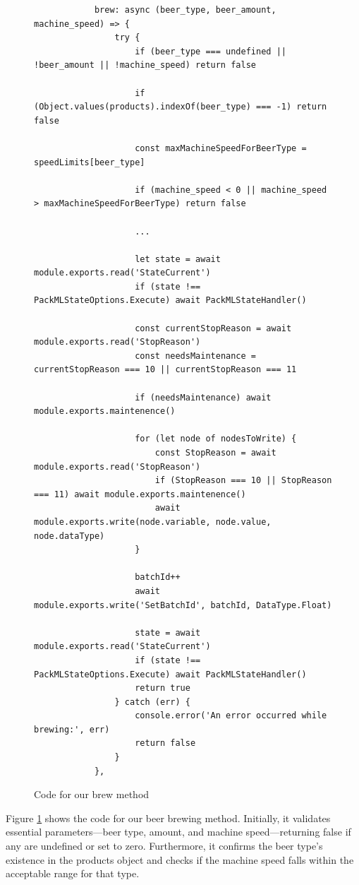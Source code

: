 

\begin{center}
    \centering
    \begin{figure}[H]
        \begin{verbatim}
            brew: async (beer_type, beer_amount, machine_speed) => {
                try {
                    if (beer_type === undefined || !beer_amount || !machine_speed) return false                    

                    if (Object.values(products).indexOf(beer_type) === -1) return false

                    const maxMachineSpeedForBeerType = speedLimits[beer_type]

                    if (machine_speed < 0 || machine_speed > maxMachineSpeedForBeerType) return false

                    ... 

                    let state = await module.exports.read('StateCurrent')
                    if (state !== PackMLStateOptions.Execute) await PackMLStateHandler()

                    const currentStopReason = await module.exports.read('StopReason')
                    const needsMaintenance = currentStopReason === 10 || currentStopReason === 11

                    if (needsMaintenance) await module.exports.maintenence()

                    for (let node of nodesToWrite) {
                        const StopReason = await module.exports.read('StopReason')
                        if (StopReason === 10 || StopReason === 11) await module.exports.maintenence()
                        await module.exports.write(node.variable, node.value, node.dataType)
                    }

                    batchId++
                    await module.exports.write('SetBatchId', batchId, DataType.Float)

                    state = await module.exports.read('StateCurrent')
                    if (state !== PackMLStateOptions.Execute) await PackMLStateHandler()
                    return true
                } catch (err) {
                    console.error('An error occurred while brewing:', err)
                    return false
                }
            },
        \end{verbatim}
        \caption{Code for our brew method}
        \label{fig:opc_client_brew}
    \end{figure}
\end{center}
Figure \ref{fig:opc_client_brew} shows the code for our beer brewing method. Initially, it validates essential parameters—beer type, amount, and machine speed—returning false if any are undefined or set to zero. Furthermore, it confirms the beer type's existence in the products object and checks if the machine speed falls within the acceptable range for that type. \newline

